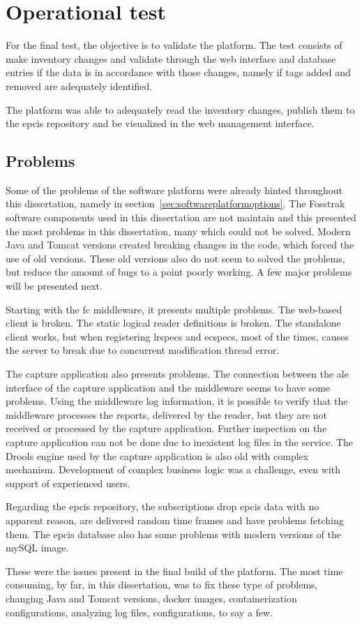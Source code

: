 \section{Operational test}

For the final test, the objective is to validate the platform.
The test consists of make inventory changes and validate through the web interface and database entries if the data is in accordance with those changes, namely if tags added and removed are adequately identified.

The platform was able to adequately read the inventory changes, publish them to the \ac{epcis} repository and be visualized in the web management interface.

\subsection{Problems}

Some of the problems of the software platform were already hinted throughout this dissertation, namely in section~\ref{sec:softwareplatformoptions}.
The Fosstrak software components used in this dissertation are not maintain and this presented the most problems in this dissertation, many which could not be solved.
Modern Java and Tomcat versions created breaking changes in the code, which forced the use of old versions. 
These old versions also do not seem to solved the problems, but reduce the amount of bugs to a point poorly working. A few major problems will be presented next.

Starting with the \ac{fc} middleware, it presents multiple problems. 
The web-based client is broken. The static logical reader definitions is broken.
The standalone client works, but when registering \acp{lrspec} and \acp{ecspec}, most of the times, causes the server to break due to concurrent modification thread error. 

The capture application also presents problems.
The connection between the \ac{ale} interface of the capture application and the middleware seems to have some problems. Using the middleware log information, it is possible to verify that the middleware processes the reports, delivered by the reader, but they are not received or processed by the capture application.
Further inspection on the capture application can not be done due to inexistent log files in the service.
The Drools engine used by the capture application is also old with complex mechanism. Development of complex business logic was a challenge, even with support of experienced users.

Regarding the \ac{epcis} repository, the subscriptions drop \ac{epcis} data with no apparent reason, are delivered random time frames and have problems fetching them. The \ac{epcis} database also has some problems with modern versions of the mySQL image.

These were the issues present in the final build of the platform. The most time consuming, by far, in this dissertation, was to fix these type of problems, changing Java and Tomcat versions, docker images, containerization configurations, analyzing log files, configurations, to say a few.